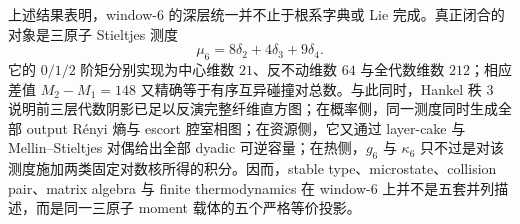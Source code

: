 \noindent
上述结果表明，window-\(6\) 的深层统一并不止于根系字典或 Lie 完成。真正闭合的对象是三原子 Stieltjes 测度
\[
\mu_6=8\delta_2+4\delta_3+9\delta_4.
\]
它的 \(0/1/2\) 阶矩分别实现为中心维数 \(21\)、反不动维数 \(64\) 与全代数维数 \(212\)；相应差值 \(M_2-M_1=148\) 又精确等于有序互异碰撞对总数。与此同时，Hankel 秩 \(3\) 说明前三层代数阴影已足以反演完整纤维直方图；在概率侧，同一测度同时生成全部 output Rényi 熵与 escort 腔室相图；在资源侧，它又通过 layer-cake 与 Mellin--Stieltjes 对偶给出全部 dyadic 可逆容量；在热侧，\(g_6\) 与 \(\kappa_6\) 只不过是对该测度施加两类固定对数核所得的积分。因而，stable type、microstate、collision pair、matrix algebra 与 finite thermodynamics 在 window-\(6\) 上并不是五套并列描述，而是同一三原子 moment 载体的五个严格等价投影。
\endinput
